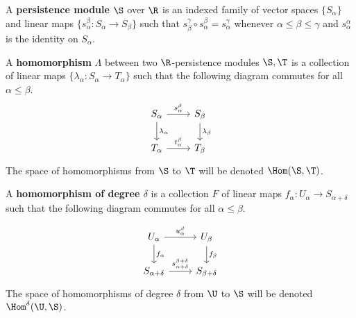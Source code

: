 
\begin{definition}
  A \textbf{persistence module} $\S$ over $\R$ is an indexed family of vector spaces $\{S_\alpha\}$ and linear maps $\{s_\alpha^\beta : S_\alpha\to S_\beta\}$ such that $s^\gamma_\beta\circ s_\alpha^\beta = s_\alpha^\gamma$ whenever $\alpha\leq\beta\leq\gamma$ and $s_\alpha^\alpha$ is the identity on $S_\alpha$.
\end{definition}


\begin{definition}
  A \textbf{homomorphism} $\Lambda$ between two $\R$-persistence modules $\S, \T$ is a collection of linear maps $\{\lambda_\alpha : S_\alpha\to T_\alpha\}$ such that the following diagram commutes for all $\alpha\leq\beta$.
  \begin{equation}\label{dgm:homomorphism}
    \begin{tikzcd}
      S_\alpha\arrow{r}{s_\alpha^\beta}\arrow{d}{\lambda_\alpha} &
      S_\beta\arrow{d}{\lambda_\beta}\\
      T_\alpha\arrow{r}{t_\alpha^\beta} &
      T_\beta
  \end{tikzcd}\end{equation}
  The space of homomorphisms from $\S$ to $\T$ will be denoted $\Hom(\S, \T)$.
\end{definition}

\begin{definition}
  A \textbf{homomorphism of degree $\delta$} is a collection $F$ of linear maps $f_\alpha : U_\alpha\to S_{\alpha+\delta}$ such that the following diagram commutes for all $\alpha\leq\beta$.

  \begin{equation}\label{dgm:shifted_homomorphism}
    \begin{tikzcd}
      U_\alpha\arrow{r}{u_\alpha^\beta}\arrow{d}{f_\alpha} &
      U_\beta\arrow{d}{f_\beta}\\
      S_{\alpha+\delta}\arrow{r}{s_{\alpha+\delta}^{\beta+\delta}} &
      S_{\beta +\delta}
  \end{tikzcd}\end{equation}
  The space of homomorphisms of degree $\delta$ from $\U$ to $\S$ will be denoted $\Hom^\delta(\U, \S)$.
\end{definition}

